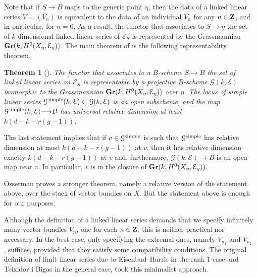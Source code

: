 \documentclass[11pt,reqno]{amsart}
\theoremstyle{plain}
\newtheorem{theorem}{Theorem}[section]
\theoremstyle{definition}
\theoremstyle{remark}
\numberwithin{equation}{section}
\renewcommand{\to}{{\longrightarrow}}
\numberwithin{equation}{section}
\begin{document}
Note that if $S \to B$ maps to the generic point $\eta$, then the data of a linked linear series $V = (V_n)$ is equivalent to the data of an individual $V_n$ for any $n \in {\bf Z}$, and in particular, for $n = 0$.
As a result, the functor that associates to $S \to \eta$ the set of $k$-dimensional linked linear series of $\mathcal E_S$ is represented by the Grassmannian ${\bf Gr}(k, H^0(X_\eta, \mathcal E_\eta))$.
The main theorem of \cite{oss:14} is the following representability theorem.
\begin{theorem}[{\cite[Theorem~3.4.7]{oss:14}}]
  \label{thm:lls}
  The functor that associates to a $B$-scheme $S \to B$ the set of linked linear series on $\mathcal E_S$ is representable by a projective $B$-scheme $\mathcal G(k, \mathcal E)$ isomorphic to the Grassmannian ${\bf Gr}(k, H^0(X_\eta, \mathcal E_\eta))$ over $\eta$.
  The locus of simple linear series ${\mathcal G}^{\rm simple}(k, \mathcal E) \subset {\mathcal G}(k, \mathcal E)$ is an open subscheme, and the map ${\mathcal G}^{\rm simple}(k, \mathcal E) \to B$ has universal relative dimension at least $k(d-k-r(g-1))$.
\end{theorem}
The last statement implies that if $v \in {\mathcal G}^{\rm simple}$ is such that ${\mathcal G}^{\rm simple}$ has relative dimension at most $k(d-k-r(g-1))$ at $v$, then it has relative dimension exactly $k(d-k-r(g-1))$ at $v$ and, furthermore, $\mathcal G(k, \mathcal E) \to B$ is an open map near $v$.
In particular, $v$ is in the closure of ${\bf Gr}(k, H^0(X_\eta, \mathcal E_\eta))$.
\begin{remark}
  Osserman proves a stronger theorem, namely a relative version of the statement above, over the stack of vector bundles on $X$.
  But the statement above is enough for our purposes.  
\end{remark}

Although the definition of a linked linear series demands that we specify infinitely many vector bundles $V_n$, one for each $n \in {\bf Z}$, this is neither practical nor necessary.
In the best case, only specifying the extremal ones, namely $V_{n_1}$ and $V_{n_2}$, suffices, provided that they satisfy some compatibility conditions.
The original definition of limit linear series due to Eisenbud--Harris \cite{eis.har:86,eis.har:84} in the rank 1 case and Teixidor i Bigas \cite{tei-i-big:91} in the general case, took this minimalist approach.
\end{document}
